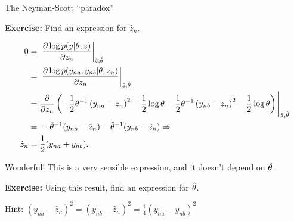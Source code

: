 \begin{frame}{The Neyman-Scott ``paradox''}

\textbf{Exercise:} Find an expression for $\hat{z}_n$.

\begin{align*}
%
0 ={}& \fracat{\partial \log p(y | \theta, z)}{\partial z_n}{\hat{z}, \thetahat} \\
={}& \fracat{\partial \log p(y_{na}, y_{nb} | \theta, z_n)}{\partial z_n}{\hat{z}, \thetahat}\\
={}& \frac{\partial}{\partial z_n}
\left(
-\frac{1}{2} \theta^{-1} \left( y_{na}  - z_n\right)^2 - \frac{1}{2}\log \theta
-\frac{1}{2} \theta^{-1} \left( y_{nb}  - z_n\right)^2 - \frac{1}{2}\log \theta
\right)
\Bigg|_{\hat{z}, \thetahat}\\
={}& - \thetahat^{-1} (y_{na}  - \hat{z}_n)
    - \thetahat^{-1} (y_{nb}  - \hat{z}_n) \Rightarrow \\
\hat{z}_n ={}& \frac{1}{2}(y_{na} + y_{nb}).
%
\end{align*}

Wonderful!  This is a very sensible expression, and it doesn't depend on
$\hat\theta$.

\vspace{1em}
\textbf{Exercise:} Using this result, find an expression for $\hat\theta$.

Hint:
%
$
%
\left( y_{na}  - \hat{z}_n\right)^2 =
\left( y_{nb}  - \hat{z}_n\right)^2 =
\frac{1}{4} \left( y_{na}  - y_{nb}\right)^2
%
$
%

\end{frame}




